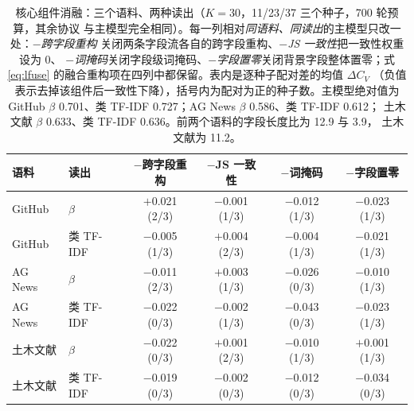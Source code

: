 \documentclass[11pt]{ctexart}
\begin{document}
\label{sec:core-ablation}

\begin{table}[t]
\centering
\caption{核心组件消融：三个语料、两种读出（$K=30$，11/23/37 三个种子，700 轮预算，其余协议
与主模型完全相同）。每一列相对\emph{同语料、同读出}的主模型只改一处：\emph{$-$跨字段重构}
关闭两条字段流各自的跨字段重构、\emph{$-$JS 一致性}把一致性权重设为 $0$、
\emph{$-$词掩码}关闭字段级词掩码、\emph{$-$字段置零}关闭背景字段整体置零；式
\eqref{eq:lfuse} 的融合重构项在四列中都保留。表内是逐种子配对差的均值 $\Delta C_V$
（负值表示去掉该组件后一致性下降），括号内为配对为正的种子数。主模型绝对值为
GitHub $\beta$ 0.701、类 TF-IDF 0.727；AG News $\beta$ 0.586、类 TF-IDF 0.612；
土木文献 $\beta$ 0.633、类 TF-IDF 0.636。前两个语料的字段长度比为 12.9 与 3.9，
土木文献为 11.2。}
\label{tab:core-ablation}
\small
\setlength{\tabcolsep}{5pt}
\begin{tabular}{llcccc}
\toprule
语料 & 读出 & $-$跨字段重构 & $-$JS 一致性 & $-$词掩码 & $-$字段置零 \\
\midrule
GitHub & $\beta$ & $+$0.021 (2/3) & $-$0.001 (1/3) & $-$0.012 (1/3) & $-$0.023 (1/3) \\
GitHub & 类 TF-IDF & $-$0.005 (1/3) & $+$0.004 (2/3) & $-$0.004 (1/3) & $-$0.021 (1/3) \\
\midrule
AG News & $\beta$ & $-$0.011 (2/3) & $+$0.003 (1/3) & $-$0.026 (0/3) & $-$0.010 (1/3) \\
AG News & 类 TF-IDF & $-$0.022 (0/3) & $-$0.002 (1/3) & $-$0.043 (0/3) & $-$0.023 (1/3) \\
\midrule
土木文献 & $\beta$ & $-$0.022 (0/3) & $+$0.001 (2/3) & $-$0.010 (1/3) & $+$0.001 (1/3) \\
土木文献 & 类 TF-IDF & $-$0.019 (0/3) & $-$0.002 (0/3) & $-$0.012 (0/3) & $-$0.034 (0/3) \\
\bottomrule
\end{tabular}
\end{table}
\end{document}
